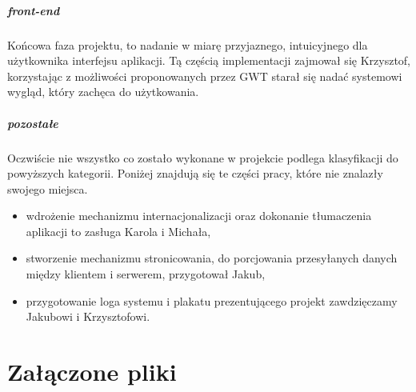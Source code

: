 \documentclass[licencjacka]{pracamgr}
\begin{document}
\paragraph{front-end}
Końcowa faza projektu, to nadanie w miarę przyjaznego, intuicyjnego dla użytkownika interfejsu aplikacji. Tą częścią implementacji zajmował się Krzysztof,
korzystając z możliwości proponowanych przez GWT starał się nadać systemowi wygląd, który zachęca do użytkowania.

\paragraph{pozostałe}
Oczwiście nie wszystko co zostało wykonane w projekcie podlega klasyfikacji do powyższych kategorii. Poniżej znajdują się te części pracy, 
które nie znalazły swojego miejsca.
\begin{itemize}
\item wdrożenie mechanizmu internacjonalizacji oraz dokonanie tłumaczenia aplikacji to zasługa Karola i Michała,
\item stworzenie mechanizmu stronicowania, do porcjowania przesyłanych danych między klientem i serwerem, przygotował Jakub,
\item przygotowanie loga systemu i plakatu prezentującego projekt zawdzięczamy Jakubowi i Krzysztofowi.
\end{itemize}

\chapter{Załączone pliki}
\end{document}
